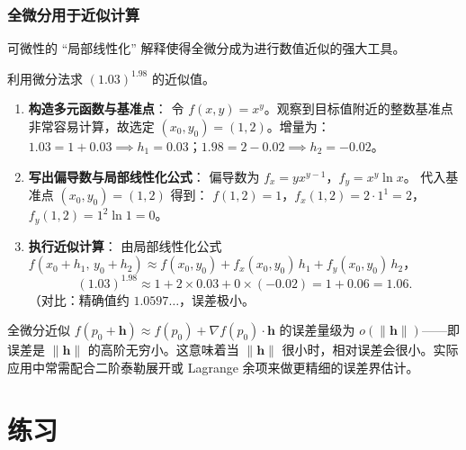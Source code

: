 \documentclass[lang=cn,11pt]{elegantbook}
\begin{document}
\subsubsection*{全微分用于近似计算}

可微性的 ``局部线性化'' 解释使得全微分成为进行数值近似的强大工具。

\begin{exercise}[利用全微分做近似计算] \label{ex:diff-approx}
利用微分法求 $(1.03)^{1.98}$ 的近似值。
\end{exercise}

\begin{solution}
\begin{enumerate}
  \item \textbf{构造多元函数与基准点}：
  令 $f(x,y)=x^y$。观察到目标值附近的整数基准点非常容易计算，故选定 $(x_0,y_0)=(1,2)$。增量为：
  $1.03=1+0.03 \implies h_1=0.03$；$1.98=2-0.02 \implies h_2=-0.02$。
  
  \item \textbf{写出偏导数与局部线性化公式}：
  偏导数为 $f_x=y x^{y-1}$，$f_y=x^y\ln x$。
  代入基准点 $(x_0,y_0)=(1,2)$ 得到：
  $f(1,2)=1$，$f_x(1,2)=2\cdot 1^1=2$，$f_y(1,2)=1^2\ln 1=0$。
  
  \item \textbf{执行近似计算}：
  由局部线性化公式 $f(x_0+h_1,\,y_0+h_2)\approx f(x_0,y_0)+f_x(x_0,y_0)\,h_1+f_y(x_0,y_0)\,h_2$，
  \[
  (1.03)^{1.98}\approx 1+2\times 0.03+0\times(-0.02)=1+0.06=\boxed{1.06}.
  \]
  （对比：精确值约 $1.0597\dots$，误差极小。
\end{enumerate}
\end{solution}

\begin{remark}[近似计算的误差估计]
全微分近似 $f(p_0+\boldsymbol h)\approx f(p_0)+ \nabla f(p_0)\cdot\boldsymbol h$ 的误差量级为 $o(\|\boldsymbol h\|)$——即误差是 $\|\boldsymbol h\|$ 的高阶无穷小。这意味着当 $\|\boldsymbol h\|$ 很小时，相对误差会很小。实际应用中常需配合二阶泰勒展开或 Lagrange 余项来做更精细的误差界估计。
\end{remark}

\section{练习}
\end{document}
